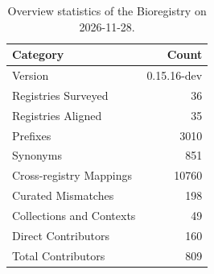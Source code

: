 \begin{table}
\caption{Overview statistics of the Bioregistry on 2026-11-28.}
\label{tab:bioregistry-summary}
\begin{tabular}{lr}
\toprule
Category & Count \\
\midrule
Version & 0.15.16-dev \\
Registries Surveyed & 36 \\
Registries Aligned & 35 \\
Prefixes & 3010 \\
Synonyms & 851 \\
Cross-registry Mappings & 10760 \\
Curated Mismatches & 198 \\
Collections and Contexts & 49 \\
Direct Contributors & 160 \\
Total Contributors & 809 \\
\bottomrule
\end{tabular}
\end{table}
